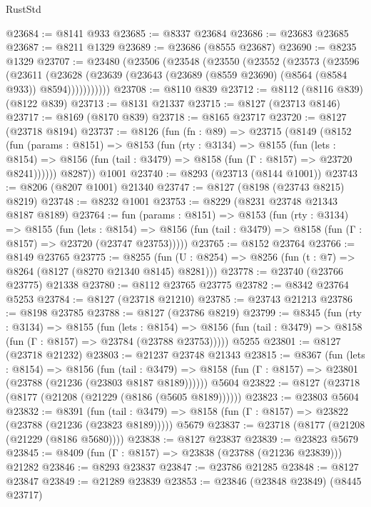 \begin{lexlean}{RustStd}
\begin{coremodule}
@23684 := @8141 @933
@23685 := @8337 @23684
@23686 := @23683 @23685
@23687 := @8211 @1329
@23689 := @23686 (@8555 @23687)
@23690 := @8235 @1329
@23707 := @23480
    (@23506
      (@23548
        (@23550
          (@23552
            (@23573
              (@23596
                (@23611
                  (@23628
                    (@23639 (@23643 (@23689 (@8559 @23690) (@8564 (@8584 @933)) @8594)))))))))))
@23708 := @8110 @839
@23712 := @8112 (@8116 @839) (@8122 @839)
@23713 := @8131 @21337
@23715 := @8127 (@23713 @8146)
@23717 := @8169 (@8170 @839)
@23718 := @8165 @23717
@23720 := @8127 (@23718 @8194)
@23737 := @8126
    (fun (fn : @89) =>
    @23715
      (@8149
        (@8152
          (fun (params : @8151) =>
          @8153
            (fun (rty : @3134) =>
            @8155
              (fun (lets : @8154) =>
              @8156 (fun (tail : @3479) => @8158 (fun (Γ : @8157) => @23720 @8241))))))
        @8287))
    @1001
@23740 := @8293 (@23713 (@8144 @1001))
@23743 := @8206 (@8207 @1001) @21340
@23747 := @8127 (@8198 (@23743 @8215) @8219)
@23748 := @8232 @1001
@23753 := @8229 (@8231 @23748 @21343 @8187 @8189)
@23764 := fun (params : @8151) =>
  @8153
    (fun (rty : @3134) =>
    @8155
      (fun (lets : @8154) =>
      @8156 (fun (tail : @3479) => @8158 (fun (Γ : @8157) => @23720 (@23747 @23753)))))
@23765 := @8152 @23764
@23766 := @8149 @23765
@23775 := @8255
    (fun (U : @8254) => @8256 (fun (t : @7) => @8264 (@8127 (@8270 @21340 @8145) @8281)))
@23778 := @23740 (@23766 @23775) @21338
@23780 := @8112 @23765 @23775
@23782 := @8342 @23764 @5253
@23784 := @8127 (@23718 @21210)
@23785 := @23743 @21213
@23786 := @8198 @23785
@23788 := @8127 (@23786 @8219)
@23799 := @8345
    (fun (rty : @3134) =>
    @8155
      (fun (lets : @8154) =>
      @8156 (fun (tail : @3479) => @8158 (fun (Γ : @8157) => @23784 (@23788 @23753)))))
    @5255
@23801 := @8127 (@23718 @21232)
@23803 := @21237 @23748 @21343
@23815 := @8367
    (fun (lets : @8154) =>
    @8156
      (fun (tail : @3479) =>
      @8158 (fun (Γ : @8157) => @23801 (@23788 (@21236 (@23803 @8187 @8189))))))
    @5604
@23822 := @8127 (@23718 (@8177 (@21208 (@21229 (@8186 (@5605 @8189))))))
@23823 := @23803 @5604
@23832 := @8391
    (fun (tail : @3479) => @8158 (fun (Γ : @8157) => @23822 (@23788 (@21236 (@23823 @8189)))))
    @5679
@23837 := @23718 (@8177 (@21208 (@21229 (@8186 @5680))))
@23838 := @8127 @23837
@23839 := @23823 @5679
@23845 := @8409 (fun (Γ : @8157) => @23838 (@23788 (@21236 @23839))) @21282
@23846 := @8293 @23837
@23847 := @23786 @21285
@23848 := @8127 @23847
@23849 := @21289 @23839
@23853 := @23846 (@23848 @23849) (@8445 @23717)

\end{coremodule}
\end{lexlean}
